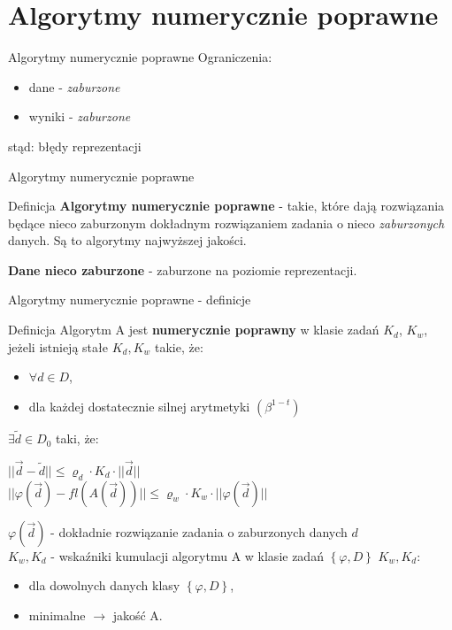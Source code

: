 \section{Algorytmy numerycznie poprawne}
\begin{frame}{Algorytmy numerycznie poprawne}
	Ograniczenia:
    \begin{itemize}
    	\item dane - {\it zaburzone}
    	\item wyniki - {\it zaburzone}
    \end{itemize}
    stąd: błędy reprezentacji
\end{frame}
\begin{frame}{Algorytmy numerycznie poprawne}
	\begin{block}{Definicja}
		{\bf Algorytmy numerycznie poprawne} - takie, które dają rozwiązania będące nieco zaburzonym dokładnym rozwiązaniem zadania o nieco {\it zaburzonych} danych. Są to algorytmy najwyższej jakości.
        
        {\bf Dane nieco zaburzone} - zaburzone na poziomie reprezentacji.
	\end{block}
\end{frame}
\begin{frame}{Algorytmy numerycznie poprawne - definicje}
	\begin{block}{Definicja}
    	Algorytm A jest {\bf numerycznie poprawny} w klasie zadań $K_d$, $K_w$, jeżeli istnieją stałe $K_d, K_w$ takie, że:
        \begin{itemize}
        	\item $\forall d \in D$,
            \item dla każdej dostatecznie silnej arytmetyki $\left( \beta^{1-t} \right)$
        \end{itemize}
        $\exists \tilde{d} \in D_0$ taki, że:
        
        {\centering
        	$|| \vec{d} - \tilde{d} || \le \varrho_d \cdot K_d \cdot || \vec{d} ||$ \\ \vspace{.1cm}
            $|| \varphi(\vec{d}) - fl(A(\vec{d})) || \le \varrho_w \cdot K_w \cdot || \varphi(\vec{d}) ||$ \\}

        $\varphi(\vec{d})$ - dokładnie rozwiązanie zadania o zaburzonych danych $d$ \\
        $K_w, K_d$ - wskaźniki kumulacji algorytmu A w klasie zadań $\left\{\varphi, D\right\}$
        $K_w, K_d$:
        \begin{itemize}
        	\item dla dowolnych danych klasy $\left\{ \varphi, D \right\}$,
            \item minimalne $\rightarrow$ jakość A.
        \end{itemize}
	\end{block}
\end{frame}
